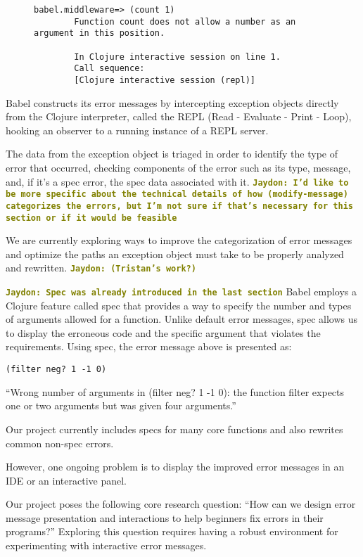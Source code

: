 \documentclass[12pt]{article}
\newcommand{\comment}[1]{{\bf \tt  {#1}}}
\newcommand{\jscomment}[1]{\textcolor{olive}{\comment{Jaydon: {#1}}}}
\begin{document}
\begin{figure}[h]
	\centering
	\begin{lstlisting}[breaklines=true, basicstyle=\ttfamily]
        babel.middleware=> (count 1)
        Function count does not allow a number as an argument in this position.

        In Clojure interactive session on line 1.
        Call sequence:
        [Clojure interactive session (repl)]
	\end{lstlisting}
\end{figure}

Babel constructs its error messages by intercepting exception objects directly from the Clojure interpreter, called the REPL (Read - Evaluate - Print - Loop), hooking an observer to a running instance of a REPL server.

The data from the exception object is triaged in order to identify the type of error that occurred, checking components of the error such as its type, message, and, if it's a spec error, the spec data associated with it.
\jscomment{I'd like to be more specific about the technical details of how (modify-message) categorizes the errors, but I'm not sure if that's necessary for this section or if it would be feasible}

We are currently exploring ways to improve the categorization of error messages and optimize the paths an exception object must take to be properly analyzed and rewritten. \jscomment{(Tristan's work?)}

\jscomment{Spec was already introduced in the last section}
Babel employs a Clojure feature called spec that provides a way to specify the number and types of arguments allowed for a function. 
Unlike default error messages, spec allows us to display the erroneous code and the specific argument that violates the requirements. 
Using spec, the error message above is presented as: 
\begin{verbatim}
(filter neg? 1 -1 0)
\end{verbatim}
``Wrong number of arguments in (filter neg? 1 -1 0): the function filter expects one or two arguments but was given four arguments.''

Our project currently includes specs for many core functions and also rewrites common non-spec errors. 

However, one ongoing problem is to display the improved error messages in an IDE or an interactive panel. 

Our project poses the following core research question: 
``How can we design error message presentation and interactions to help beginners fix errors in their programs?'' 
Exploring this question requires having a robust environment for experimenting with interactive error messages.
\end{document}
